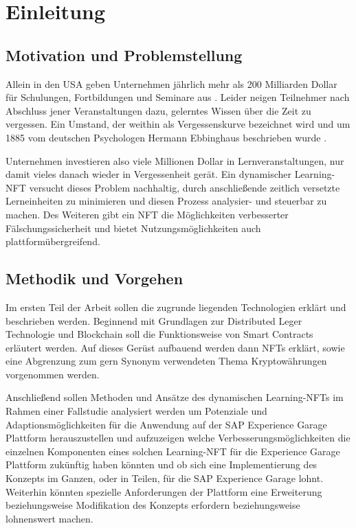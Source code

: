 \chapter{Einleitung}

\section{Motivation und Problemstellung}

Allein in den USA geben Unternehmen jährlich mehr als 200 Milliarden Dollar für Schulungen, Fortbildungen und Seminare aus \parencite[vgl.][]{LloydMewkirk.2011}.
Leider neigen Teilnehmer nach Abschluss jener Veranstaltungen dazu, gelerntes Wissen über die Zeit zu vergessen.
Ein Umstand, der weithin als Vergessenskurve bezeichnet wird und um 1885 vom deutschen Psychologen Hermann Ebbinghaus beschrieben wurde \parencite[vgl.][]{Ebbinghaus.1885}. 

Unternehmen investieren also viele Millionen Dollar in Lernveranstaltungen, nur damit vieles danach wieder in Vergessenheit gerät.
Ein dynamischer Learning-\acs{NFT} versucht dieses Problem nachhaltig, durch anschließende zeitlich versetzte Lerneinheiten zu minimieren und diesen Prozess analysier- und steuerbar zu machen. 
Des Weiteren gibt ein \acf{NFT} die Möglichkeiten verbesserter Fälschungssicherheit und bietet Nutzungsmöglichkeiten auch plattformübergreifend.

\section{Methodik und Vorgehen}

Im ersten Teil der Arbeit sollen die zugrunde liegenden Technologien erklärt und beschrieben werden.
Beginnend mit Grundlagen zur Distributed Leger Technologie und Blockchain soll die Funktionsweise von Smart Contracts erläutert werden.
Auf dieses Gerüst aufbauend werden dann \ac{NFT}s erklärt, sowie eine Abgrenzung zum gern Synonym verwendeten Thema Kryptowährungen vorgenommen werden.

Anschließend sollen Methoden und Ansätze des dynamischen Learning-\ac{NFT}s im Rahmen einer Fallstudie analysiert werden um Potenziale und Adaptionsmöglichkeiten für die Anwendung
auf der SAP Experience Garage Plattform herauszustellen und aufzuzeigen welche Verbesserungsmöglichkeiten die einzelnen Komponenten eines solchen
Learning-\ac{NFT} für die Experience Garage Plattform zukünftig haben könnten und ob sich eine Implementierung des Konzepts im Ganzen,
oder in Teilen, für die SAP Experience Garage lohnt.
Weiterhin könnten spezielle Anforderungen der Plattform eine Erweiterung beziehungsweise Modifikation des Konzepts erfordern beziehungsweise lohnenswert machen.

